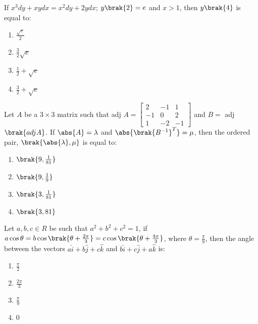 \iffalse
\title{Assignment}
\author{K.AKSHAY TEJA}
\section{mcq-single}
\fi
\item  If $x^3dy + xydx = x^2dy + 2ydx$; $y\brak{2} = e$ and $x > 1$, then $y\brak{4}$ is equal to: \hfill {}
        
        \begin{multicols}{4}
\begin{enumerate}
    \item $\frac{\sqrt{e}}{2}$
    \item $\frac{3}{2} \sqrt{e}$
    \item $\frac{1}{2} + \sqrt{e}$
    \item $\frac{3}{2} + \sqrt{e}$
\end{enumerate}
\end{multicols}

\item Let $A$ be a $3 \times 3$ matrix such that adj $A = \begin{bmatrix}
2 &-1& 1\\-1& 0& 2\\1& -2& -1
\end{bmatrix} $
and $B =$ adj$\brak{adj  A}$. If $\abs{A} = \lambda$ and $\abs{\brak{B^{-1}}^T} = \mu$, then the ordered pair, $\brak{\abs{\lambda}, \mu}$ is equal to:
 \hfill {}

          \begin{multicols}{4}

\begin{enumerate}
    \item $\brak{9, \frac{1}{81}}$
    \item $\brak{9, \frac{1}{9}}$
    \item $\brak{3, \frac{1}{81}}$
    \item $\brak{3, 81}$
\end{enumerate}
\end{multicols}

\item Let $a, b, c \in R$ be such that $a^2 + b^2 + c^2 = 1$, if $a \cos \theta = b \cos\brak{\theta + \frac{2\pi}{3}} = c \cos\brak{\theta + \frac{4\pi}{3}}$, where $\theta = \frac{\pi}{9}$, then the angle between the vectors $a\hat{i} + b\hat{j} + c\hat{k}$ and $b\hat{i} + c\hat{j}+ a\hat{k} $ is: \hfill {}

        \begin{multicols}{4}

\begin{enumerate}
    \item $\frac{\pi}{2}$
    \item $\frac{2\pi}{3}$
    \item $\frac{\pi}{9}$
    \item $0$
\end{enumerate}
\end{multicols}

